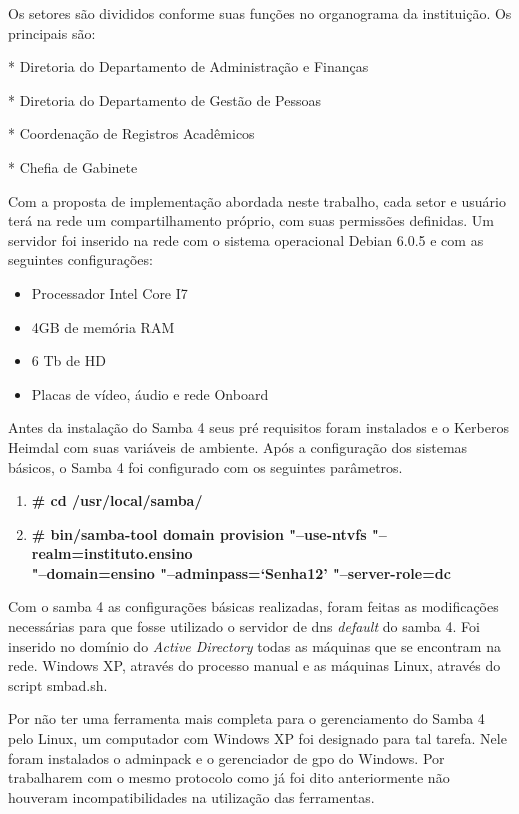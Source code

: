 \pagebreak
          				
Os setores são divididos conforme suas funções no organograma da instituição. Os principais são:

* Diretoria do Departamento de Administração e Finanças

* Diretoria do Departamento de Gestão de Pessoas

* Coordenação de Registros Acadêmicos

* Chefia de Gabinete

Com a proposta de implementação abordada neste trabalho, cada setor e usuário terá na rede um compartilhamento próprio, com suas permissões definidas. Um servidor foi inserido na rede com o sistema operacional Debian 6.0.5 e com as seguintes configurações:

\begin{itemize}
	\item{Processador Intel Core I7\textregistered}
	\item{4GB de memória RAM}
	\item{6 Tb de HD}
	\item{Placas de vídeo, áudio e rede Onboard}
\end{itemize}

Antes da instalação do Samba 4 seus pré requisitos foram instalados e o Kerberos Heimdal com suas variáveis de ambiente.
Após a configuração dos sistemas básicos, o Samba 4 foi configurado com os seguintes parâmetros.

\begin{enumerate}
	\item \textbf{\# cd /usr/local/samba/}
	\item \textbf{\# bin/samba-tool domain provision "--use-ntvfs "--realm=instituto.ensino\\"--domain=ensino  "--adminpass=`Senha12' "--server-role=dc}
\end{enumerate}

Com o samba 4 as configurações básicas realizadas, foram feitas as modificações necessárias para que fosse utilizado o servidor de dns \textit{default} do samba 4. Foi inserido no domínio do \textit{Active Directory} todas as máquinas que se encontram na rede. Windows XP, através do processo manual e as máquinas Linux, através do script smbad.sh.

Por não ter uma ferramenta mais completa para o gerenciamento do Samba 4 pelo Linux, um computador com Windows XP foi designado para tal tarefa. Nele foram instalados o adminpack e o gerenciador de gpo do Windows. Por trabalharem com o mesmo protocolo como já foi dito anteriormente não houveram incompatibilidades na utilização das ferramentas.

